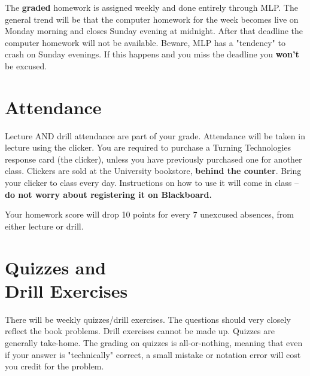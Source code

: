 \documentclass[margin,line,pifont,palatino,courier]{res}
\begin{document}
\begin{resume}
The {\bf graded} homework is assigned weekly and done entirely through MLP.  The general trend will be that the computer homework for the week becomes live on Monday morning and closes Sunday evening at midnight.  After that deadline the computer homework will not be available.  Beware, MLP has a "tendency" to crash on Sunday evenings.  If this happens and you miss the deadline you \textbf{won't} be excused.  

\section{\sc Attendance}%
Lecture AND drill attendance are part of your grade.  Attendance will be taken in lecture using the clicker.  You are required to purchase a Turning Technologies response card (the clicker), unless you have previously purchased one for another class.  Clickers are sold at the University bookstore, {\bf behind the counter}.  Bring your clicker to class every day.  Instructions on how to use it will come in class -- \textbf{do not worry about registering it on Blackboard.}

\vspace{-0.1in}
Your homework score will drop 10 points for every 7 unexcused absences, from either lecture or drill.  %

\section{\sc Quizzes and \\ Drill Exercises} There will be weekly quizzes/drill exercises.  The questions should very closely reflect the book problems.  Drill exercises cannot be made up.  Quizzes are generally take-home.  The grading on quizzes is all-or-nothing, meaning that even if your answer is "technically" correct, a small mistake or notation error will cost you credit for the problem.  %


\end{resume}
\end{document}
